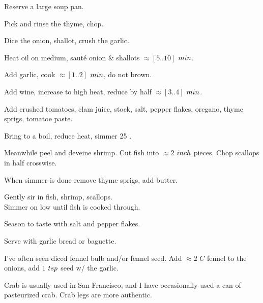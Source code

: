 \begin{preparation}
\item Reserve a large soup pan.

\item Pick and rinse the thyme, chop.

\item Dice the onion, shallot, crush the garlic.

\item Heat oil on medium, saut\'{e} onion \& shallots $\approx[5..10]$ $\minute$.

\item Add garlic, cook $\approx[1..2]$ $\minute$, do not brown.

\item Add wine, increase to high heat, reduce by half $\approx[3..4]$ $\minute$.

\item Add crushed tomatoes, clam juice, stock, salt, pepper flakes, oregano, thyme sprigs, tomatoe paste.

\item Bring to a boil, reduce heat, simmer 25 \minute.

\item Meanwhile peel and deveine shrimp.
	Cut fish into $\approx2$ $\inch$ pieces.
	Chop scallops in half crosswise.

\item When simmer is done remove thyme sprigs, add butter.

\item Gently sir in fish, shrimp, scallops.\\
	Simmer on low until fish is cooked through.

\item Season to taste with salt and pepper flakes.

\item Serve with garlic bread or baguette.
\end{preparation}


\begin{variation}
\item I've often seen diced fennel bulb and/or fennel seed.
	Add $\approx2$ $C$ fennel to the onions, add $1$ $\teaspoon$ seed w/ the garlic.

\item Crab is usually used in San Francisco, and I have occasionally used a can of pasteurized crab. Crab legs are more authentic.

\end{variation}

\recipeend%
